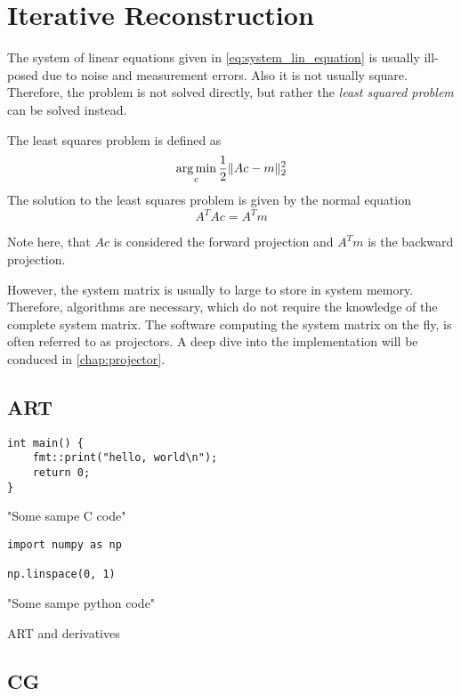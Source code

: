 \section{Iterative Reconstruction}\label{sec:iterative_reconstruction}

The system of linear equations given in \autoref{eq:system_lin_equation} is usually ill-posed due to
noise and measurement errors. Also it is not usually square. Therefore, the problem is not solved
directly, but rather the \textit{least squared problem} can be solved instead.

\begin{definition}\label{def:least_squares_problem}
	The least squares problem is defined as
	\[ \operatorname*{arg\,min}_c \frac{1}{2} \lVert Ac - m\rVert^2_2 \]
	The solution to the least squares problem is given by the normal equation
	\[ A^T A c = A^T m \]
\end{definition}

Note here, that \(Ac\) is considered the forward projection and \(A^T m\) is the backward
projection.

However, the system matrix is usually to large to store in system memory. Therefore, algorithms are
necessary, which do not require the knowledge of the complete system matrix. The software computing
the system matrix on the fly, is often referred to as projectors. A deep dive into the
implementation will be conduced in \autoref{chap:projector}.


\subsection{ART}\label{subsec:algebraic_reconstruction_technique}

\begin{listing}
	\begin{verbatim}
int main() {
    fmt::print("hello, world\n");
    return 0;
}
    \end{verbatim}
	\caption{"Some sampe C code"}
\end{listing}
\begin{listing}
	\begin{verbatim}
import numpy as np

np.linspace(0, 1)
    \end{verbatim}
	\caption{"Some sampe python code"}
\end{listing}

ART and derivatives

\subsection{CG}\label{subsec:conjuage_gradient}

